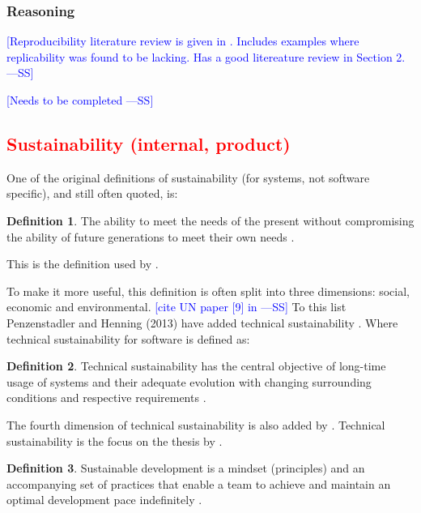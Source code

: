 \documentclass[letterpaper, cleveref]{lipics-v2019}
\newcommand{\authornote}[3]{\textcolor{#1}{[#3 ---#2]}}
\newcommand{\authornote}[3]{}
\newcommand{\wss}[1]{\authornote{blue}{SS}{#1}} %
\newcommand{\notdone}[1]{\textcolor{red}{#1}}
\theoremstyle{definition}
\newtheorem{defn}{Definition}
\begin{document}
\subsubsection*{Reasoning}

\wss{Reproducibility literature review is given in \citet{FeinbergEtAl2020}.
Includes examples where replicability was found to be lacking.  Has a good
litereature review in Section 2.}

\wss{Needs to be completed}


\subsection{\notdone{Sustainability (internal, product)}} %

One of the original definitions of sustainability (for systems, not software
specific), and still often quoted, is:

\begin{defn}
  \noindent The ability to meet the needs of the present without
  compromising the ability of future generations to meet their own needs
  \citep{Brundtland1987}.
\end{defn}

This is the definition used by \citet{IISD2019}.

To make it more useful, this definition is often split into three dimensions:
social, economic and environmental. \wss{cite UN paper [9] in
  \citet{PenzenstadlerAndHenning2013}} To this list Penzenstadler and Henning
(2013) have added technical sustainability \citep{PenzenstadlerAndHenning2013}.
Where technical sustainability for software is defined as:

\begin{defn}
  \noindent Technical sustainability has the central objective of long-time
  usage of systems and their adequate evolution with changing surrounding
  conditions and respective requirements \citep{PenzenstadlerAndHenning2013}.
\end{defn}

The fourth dimension of technical sustainability is also added by
\citep{WolframEtAl2017}.  Technical sustainability is the focus on the
thesis by \citet{Hygerth2016}.

\begin{defn}
  \noindent Sustainable development is a mindset (principles) and an
  accompanying set of practices that enable a team to achieve and maintain
  an optimal development pace indefinitely \citep{Tate2005}.
\end{defn}
\end{document}
